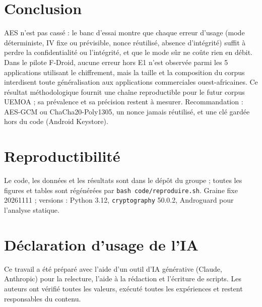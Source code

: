\documentclass[conference,a4paper]{IEEEtran}
\begin{document}
\section{Conclusion}
AES n'est pas cassé : le banc d'essai montre que chaque erreur d'usage (mode déterministe, IV fixe ou prévisible, nonce réutilisé, absence d'intégrité) suffit à perdre la confidentialité ou l'intégrité, et que le mode sûr ne coûte rien en débit. Dans le pilote F-Droid, aucune erreur hors E1 n'est observée parmi les 5 applications utilisant le chiffrement, mais la taille et la composition du corpus interdisent toute généralisation aux applications commerciales ouest-africaines. Ce résultat méthodologique fournit une chaîne reproductible pour le futur corpus UEMOA ; sa prévalence et sa précision restent à mesurer. Recommandation : AES-GCM ou ChaCha20-Poly1305, un nonce jamais réutilisé, et une clé gardée hors du code (Android Keystore).

\section*{Reproductibilité}
Le code, les données et les résultats sont dans le dépôt du groupe ; toutes les figures et tables sont régénérées par \texttt{bash code/reproduire.sh}. Graine fixe 20261111 ; versions : Python 3.12, \texttt{cryptography} 50.0.2, Androguard pour l'analyse statique.

\section*{Déclaration d'usage de l'IA}
Ce travail a été préparé avec l'aide d'un outil d'IA générative (Claude, Anthropic) pour la relecture, l'aide à la rédaction et l'écriture de scripts. Les auteurs ont vérifié toutes les valeurs, exécuté toutes les expériences et restent responsables du contenu.



\end{document}
